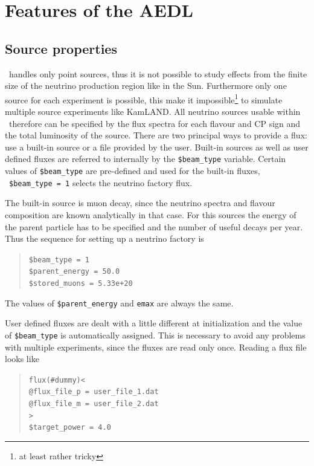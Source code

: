 \chapter{Features of the  AEDL}

\section{Source properties}
\label{sec:source}

\GLOBES\ handles only point sources, thus it is not possible
to study effects from the finite size of the neutrino production
region like in the Sun. Furthermore only one source for each experiment
is possible, this make it impossible\footnote{at least rather tricky} 
to simulate multiple source experiments like KamLAND. All neutrino
sources usable within \GLOBES\ therefore can be specified by the
flux spectra for each flavour and CP sign and the total luminosity
of the source. There are two principal ways to provide a flux:
use a built-in source or a file provided by the user. Built-in sources
as well as user defined fluxes are referred to internally by the
 {\tt \$beam\_type} variable. Certain values of  {\tt \$beam\_type} are
pre-defined and used for the built-in fluxes, \eg\ {\tt \$beam\_type = 1}
selects the neutrino factory flux.

The built-in source is muon decay, since the neutrino
spectra and flavour composition are known analytically in that case. For 
this sources the energy of the parent particle has to be specified
and the number of useful decays per year. Thus the sequence for setting
up a neutrino factory is
\begin{quote}
{\tt \$beam\_type = 1}\\
{\tt \$parent\_energy = 50.0}\\
{\tt \$stored\_muons = 5.33e+20}\\
\end{quote}
The values of {\tt \$parent\_energy} and {\tt emax} are always the same.


User defined fluxes are dealt with a little different at initialization
and the value of {\tt \$beam\_type} is automatically assigned. This is
necessary to avoid any problems with multiple experiments, since the fluxes
are read only once. Reading a flux file looks like
\begin{quote}
{\tt flux(\#dummy)<}\\
{\tt \hspace*{3ex}@flux\_file\_p = user\_file\_1.dat}\\
{\tt \hspace*{3ex}@flux\_file\_m = user\_file\_2.dat}\\
{\tt >}\\
{\tt \$target\_power = 4.0 }
\end{quote} 

